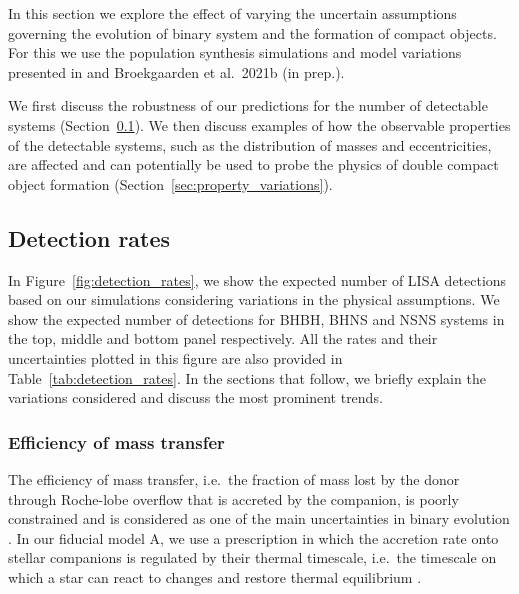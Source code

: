 In this section we explore the effect of varying the uncertain assumptions governing the evolution of binary system and the formation of compact objects. For this we use the population synthesis simulations and model variations presented in \citet{Broekgaarden+2021} and Broekgaarden et al.\ 2021b (in prep.).

We first discuss the robustness of our predictions for the number of detectable systems (Section~\ref{sec:detection_rate_analysis}). We then discuss examples of how the observable properties of the detectable systems, such as the distribution of masses and eccentricities, are affected and can potentially be used to probe the physics of double compact object formation (Section~\ref{sec:property_variations}).


\subsection{Detection rates}\label{sec:detection_rate_analysis}
In Figure~\ref{fig:detection_rates}, we show the expected number of LISA detections based on our simulations considering variations in the physical assumptions. We show the expected number of detections for BHBH, BHNS and NSNS systems in the top, middle and bottom panel respectively. All the rates and their uncertainties plotted in this figure are also provided in Table~\ref{tab:detection_rates}. 
In the sections that follow, we briefly explain the variations considered and discuss the most prominent trends. 

\subsubsection{Efficiency of mass transfer}

The efficiency of mass transfer, i.e.\ the fraction of mass lost by the donor through Roche-lobe overflow that is accreted by the companion, is poorly constrained and is considered as one of the main uncertainties in binary evolution \citep[e.g.\ ][]{deMink+2007}. In our fiducial model A, we use a prescription in which the accretion rate onto stellar companions is regulated by their thermal timescale, i.e.\ the timescale on which a star can react to changes and restore thermal equilibrium \citep[see e.g.\ ][]{Schneider+2015}. 

